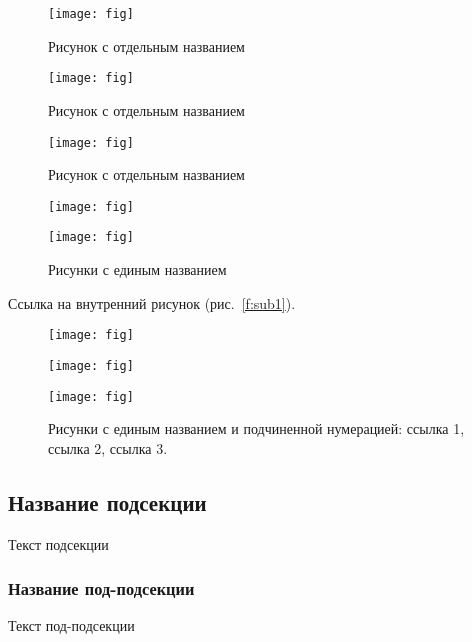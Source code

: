 \begin{figure}[!ht]
  \centering
  \begin{minipage}{5cm}
    \centering
    \texttt{[image: fig]}
    \caption{Рисунок с отдельным названием}
  \end{minipage}
  \quad
  \begin{minipage}{5cm}
    \centering
    \texttt{[image: fig]}
    \caption{Рисунок с отдельным названием}
  \end{minipage}
  \quad
  \begin{minipage}{5cm}
    \centering
    \texttt{[image: fig]}
    \caption{Рисунок с отдельным названием}
  \end{minipage}
\end{figure}

\begin{figure}[!ht]
  \centering
  \begin{minipage}{5cm}
    \texttt{[image: fig]}
  \end{minipage}
  \begin{minipage}{5cm}
    \texttt{[image: fig]}
  \end{minipage}
  \caption{Рисунки с единым названием}
\end{figure}

Ссылка на внутренний рисунок (рис.~\ref{f:sub1}).

\begin{figure}[!ht]
\centering
  \begin{minipage}{5cm}
    \texttt{[image: fig]}\subcaption{}\label{f:sub1}
  \end{minipage}
  \begin{minipage}{5cm}
    \texttt{[image: fig]}\subcaption{}\label{f:sub2}
  \end{minipage}
  \begin{minipage}{5cm}
    \texttt{[image: fig]}\subcaption{}\label{f:sub3}
  \end{minipage}
  \caption[]{%
  Рисунки с единым названием и подчиненной нумерацией:
     ссылка 1,
     ссылка 2,
     ссылка 3.
  }
\end{figure}

\subsection{Название подсекции}
Текст подсекции
\subsubsection{Название под-подсекции}
Текст под-подсекции
